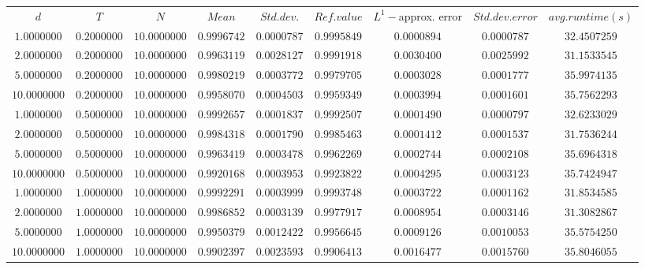 \begin{tabular}{ccccccccc}
$d$ & $T$ & $N$ & $Mean$ & $Std. dev.$ & $Ref. value$ & $L^1-$approx. error & $Std. dev. error$ & $avg. runtime (s)$\\
$1.0000000$ & $0.2000000$ & $10.0000000$ & $0.9996742$ & $0.0000787$ & $0.9995849$ & $0.0000894$ & $0.0000787$ & $32.4507259$\\
$2.0000000$ & $0.2000000$ & $10.0000000$ & $0.9963119$ & $0.0028127$ & $0.9991918$ & $0.0030400$ & $0.0025992$ & $31.1533545$\\
$5.0000000$ & $0.2000000$ & $10.0000000$ & $0.9980219$ & $0.0003772$ & $0.9979705$ & $0.0003028$ & $0.0001777$ & $35.9974135$\\
$10.0000000$ & $0.2000000$ & $10.0000000$ & $0.9958070$ & $0.0004503$ & $0.9959349$ & $0.0003994$ & $0.0001601$ & $35.7562293$\\
$1.0000000$ & $0.5000000$ & $10.0000000$ & $0.9992657$ & $0.0001837$ & $0.9992507$ & $0.0001490$ & $0.0000797$ & $32.6233029$\\
$2.0000000$ & $0.5000000$ & $10.0000000$ & $0.9984318$ & $0.0001790$ & $0.9985463$ & $0.0001412$ & $0.0001537$ & $31.7536244$\\
$5.0000000$ & $0.5000000$ & $10.0000000$ & $0.9963419$ & $0.0003478$ & $0.9962269$ & $0.0002744$ & $0.0002108$ & $35.6964318$\\
$10.0000000$ & $0.5000000$ & $10.0000000$ & $0.9920168$ & $0.0003953$ & $0.9923822$ & $0.0004295$ & $0.0003123$ & $35.7424947$\\
$1.0000000$ & $1.0000000$ & $10.0000000$ & $0.9992291$ & $0.0003999$ & $0.9993748$ & $0.0003722$ & $0.0001162$ & $31.8534585$\\
$2.0000000$ & $1.0000000$ & $10.0000000$ & $0.9986852$ & $0.0003139$ & $0.9977917$ & $0.0008954$ & $0.0003146$ & $31.3082867$\\
$5.0000000$ & $1.0000000$ & $10.0000000$ & $0.9950379$ & $0.0012422$ & $0.9956645$ & $0.0009126$ & $0.0010053$ & $35.5754250$\\
$10.0000000$ & $1.0000000$ & $10.0000000$ & $0.9902397$ & $0.0023593$ & $0.9906413$ & $0.0016477$ & $0.0015760$ & $35.8046055$\\
\end{tabular}
